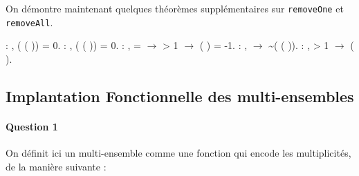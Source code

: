 \documentclass{report}
\begin{document}
On démontre maintenant quelques théorèmes supplémentaires sur \texttt{removeOne} et \texttt{removeAll}.

\noindent\begin{coqdoccode}
\coqdocemptyline
\coqdocnoindent
{}  : \coqdockw{\ensuremath{\forall}} ,   (  ( )) = 0.\coqdoceol
\coqdocemptyline
\coqdocnoindent
{}  : \coqdockw{\ensuremath{\forall}} ,   (  ( )) = 0.\coqdoceol
\coqdocemptyline
\coqdocnoindent
{}  : \coqdockw{\ensuremath{\forall}}   ,    =  \ensuremath{\rightarrow}  > 1 \ensuremath{\rightarrow}   (  ) = -1.\coqdoceol
\coqdocemptyline
\coqdocnoindent
{}  : \coqdockw{\ensuremath{\forall}}  ,   \ensuremath{\rightarrow} \~{}(  (  )).\coqdoceol
\coqdocemptyline
\coqdocnoindent
{}  : \coqdockw{\ensuremath{\forall}}  ,    > 1 \ensuremath{\rightarrow}   (  ).\coqdoceol
\coqdocemptyline
\coqdocemptyline
\end{coqdoccode}

\newpage

\subsection{Implantation Fonctionnelle des multi-ensembles\\}

\paragraph{Question 1}

On définit ici un multi-ensemble comme une fonction qui encode les multiplicités, de la manière suivante :
\end{document}
